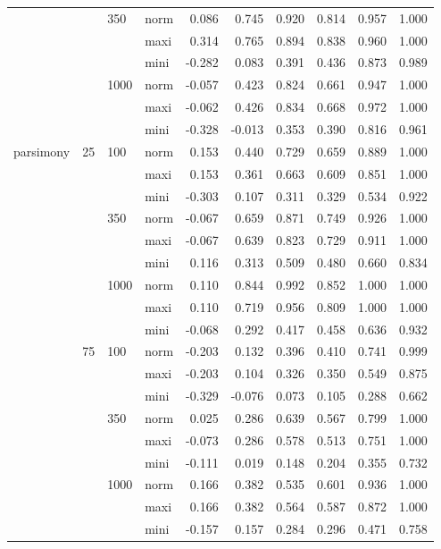 \begin{longtable}{llllrrrrrr}
   &  & 350 & norm & 0.086 & 0.745 & 0.920 & 0.814 & 0.957 & 1.000 \\ 
   &  &  & maxi & 0.314 & 0.765 & 0.894 & 0.838 & 0.960 & 1.000 \\ 
   &  &  & mini & -0.282 & 0.083 & 0.391 & 0.436 & 0.873 & 0.989 \\ 
   &  & 1000 & norm & -0.057 & 0.423 & 0.824 & 0.661 & 0.947 & 1.000 \\ 
   &  &  & maxi & -0.062 & 0.426 & 0.834 & 0.668 & 0.972 & 1.000 \\ 
   &  &  & mini & -0.328 & -0.013 & 0.353 & 0.390 & 0.816 & 0.961 \\ 
  parsimony & 25 & 100 & norm & 0.153 & 0.440 & 0.729 & 0.659 & 0.889 & 1.000 \\ 
   &  &  & maxi & 0.153 & 0.361 & 0.663 & 0.609 & 0.851 & 1.000 \\ 
   &  &  & mini & -0.303 & 0.107 & 0.311 & 0.329 & 0.534 & 0.922 \\ 
   &  & 350 & norm & -0.067 & 0.659 & 0.871 & 0.749 & 0.926 & 1.000 \\ 
   &  &  & maxi & -0.067 & 0.639 & 0.823 & 0.729 & 0.911 & 1.000 \\ 
   &  &  & mini & 0.116 & 0.313 & 0.509 & 0.480 & 0.660 & 0.834 \\ 
   &  & 1000 & norm & 0.110 & 0.844 & 0.992 & 0.852 & 1.000 & 1.000 \\ 
   &  &  & maxi & 0.110 & 0.719 & 0.956 & 0.809 & 1.000 & 1.000 \\ 
   &  &  & mini & -0.068 & 0.292 & 0.417 & 0.458 & 0.636 & 0.932 \\ 
   & 75 & 100 & norm & -0.203 & 0.132 & 0.396 & 0.410 & 0.741 & 0.999 \\ 
   &  &  & maxi & -0.203 & 0.104 & 0.326 & 0.350 & 0.549 & 0.875 \\ 
   &  &  & mini & -0.329 & -0.076 & 0.073 & 0.105 & 0.288 & 0.662 \\ 
   &  & 350 & norm & 0.025 & 0.286 & 0.639 & 0.567 & 0.799 & 1.000 \\ 
   &  &  & maxi & -0.073 & 0.286 & 0.578 & 0.513 & 0.751 & 1.000 \\ 
   &  &  & mini & -0.111 & 0.019 & 0.148 & 0.204 & 0.355 & 0.732 \\ 
   &  & 1000 & norm & 0.166 & 0.382 & 0.535 & 0.601 & 0.936 & 1.000 \\ 
   &  &  & maxi & 0.166 & 0.382 & 0.564 & 0.587 & 0.872 & 1.000 \\ 
   &  &  & mini & -0.157 & 0.157 & 0.284 & 0.296 & 0.471 & 0.758 \\ 

\end{longtable}
